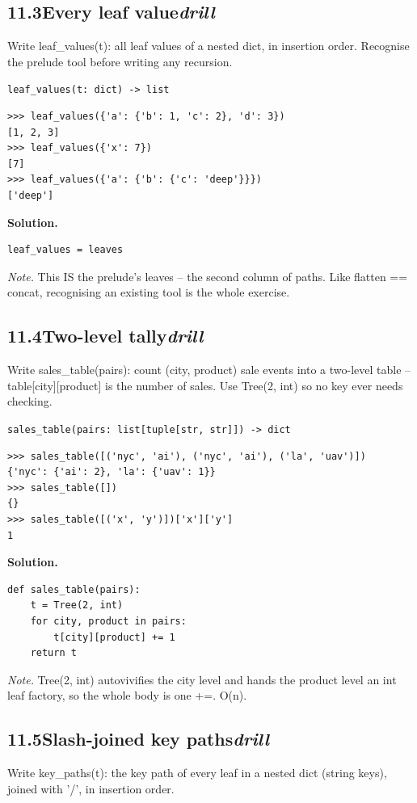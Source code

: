 \documentclass[10pt,letterpaper]{book}
\begin{document}

\subsection*{11.3\quad Every leaf value\hfill\textnormal{\textit{drill}}}
Write leaf\_values(t): all leaf values of a nested dict, in insertion order. Recognise the prelude tool before writing any recursion.

\noindent\texttt{leaf\_values(t: dict) -> list}
\begin{lstlisting}[style=ex]
>>> leaf_values({'a': {'b': 1, 'c': 2}, 'd': 3})
[1, 2, 3]
>>> leaf_values({'x': 7})
[7]
>>> leaf_values({'a': {'b': {'c': 'deep'}}})
['deep']
\end{lstlisting}
\noindent\textbf{Solution.}
\begin{lstlisting}[style=code]
leaf_values = leaves
\end{lstlisting}
\noindent\textit{Note.} This IS the prelude's leaves -- the second column of paths. Like flatten == concat, recognising an existing tool is the whole exercise.

\subsection*{11.4\quad Two-level tally\hfill\textnormal{\textit{drill}}}
Write sales\_table(pairs): count (city, product) sale events into a two-level table -- table[city][product] is the number of sales. Use Tree(2, int) so no key ever needs checking.

\noindent\texttt{sales\_table(pairs: list[tuple[str, str]]) -> dict}
\begin{lstlisting}[style=ex]
>>> sales_table([('nyc', 'ai'), ('nyc', 'ai'), ('la', 'uav')])
{'nyc': {'ai': 2}, 'la': {'uav': 1}}
>>> sales_table([])
{}
>>> sales_table([('x', 'y')])['x']['y']
1
\end{lstlisting}
\noindent\textbf{Solution.}
\begin{lstlisting}[style=code]
def sales_table(pairs):
    t = Tree(2, int)
    for city, product in pairs:
        t[city][product] += 1
    return t
\end{lstlisting}
\noindent\textit{Note.} Tree(2, int) autovivifies the city level and hands the product level an int leaf factory, so the whole body is one +=. O(n).

\subsection*{11.5\quad Slash-joined key paths\hfill\textnormal{\textit{drill}}}
Write key\_paths(t): the key path of every leaf in a nested dict (string keys), joined with '/', in insertion order.
\end{document}
